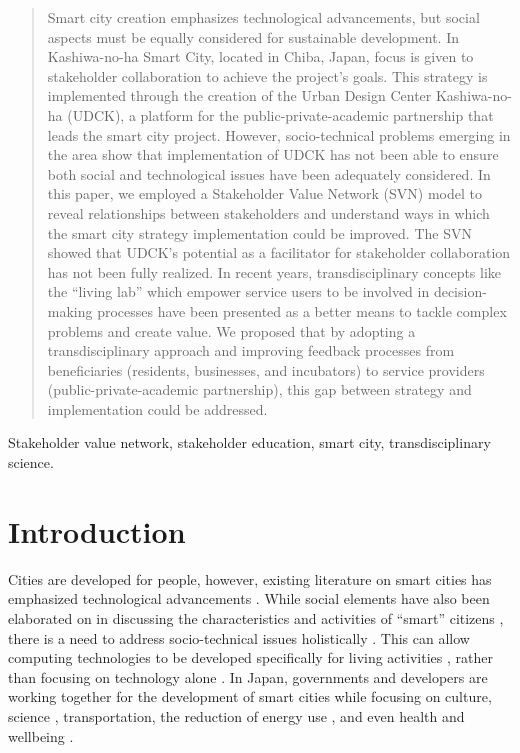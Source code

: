 \documentclass[conference]{IEEEtran}
\begin{document}
\begin{abstract}
Smart city creation emphasizes technological advancements, but social aspects must be equally considered for sustainable development. In Kashiwa-no-ha Smart City, located in Chiba, Japan, focus is given to stakeholder collaboration to achieve the project's goals. This strategy is implemented through the creation of the Urban Design Center Kashiwa-no-ha (UDCK), a platform for the public-private-academic partnership that leads the smart city project. However, socio-technical problems emerging in the area show that implementation of UDCK has not been able to ensure both social and technological issues have been adequately considered.
In this paper, we employed a Stakeholder Value Network (SVN) model to reveal relationships between stakeholders and understand ways in which the smart city strategy implementation could be improved. The SVN showed that UDCK's potential as a facilitator for stakeholder collaboration has not been fully realized. In recent years, transdisciplinary concepts like the ``living lab'' which empower service users to be involved in decision-making processes have been presented as a better means to tackle complex problems and create value. We proposed that by adopting a transdisciplinary approach and improving feedback processes from beneficiaries (residents, businesses, and incubators) to service providers (public-private-academic partnership), this gap between strategy and implementation could be addressed.
\end{abstract}


\IEEEoverridecommandlockouts
\begin{keywords}
Stakeholder value network, stakeholder education, smart city, transdisciplinary science.
\end{keywords}
\IEEEpeerreviewmaketitle


\section{\textbf{Introduction}}

Cities are developed for people, however, existing literature on smart cities has emphasized technological advancements \cite{nam2011smart}. While social elements have also been elaborated on in discussing the characteristics and activities of ``smart'' citizens \cite{giffinger2007smart}, there is a need to address socio-technical issues holistically \cite{zubizarreta2015smart}. This can allow computing technologies to be developed specifically for living activities \cite{washburn2009helping}, rather than focusing on technology alone \cite{fernandez2016stakeholders}. In Japan, governments and developers are working together for the development of smart cities while focusing on culture, science \cite{keihanna}, transportation, the reduction of energy use \citep{toyota,future}, and even health and wellbeing \cite{trencher2017stretching}.
\end{document}
